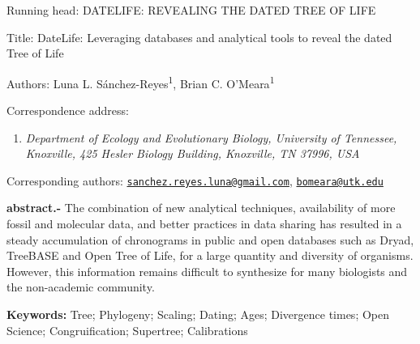 \documentclass[]{article}
\title{}
\author{}
\date{}
\providecommand{\tightlist}{%
  \setlength{\itemsep}{0pt}\setlength{\parskip}{0pt}}
\begin{document}
Running head: DATELIFE: REVEALING THE DATED TREE OF LIFE

Title: DateLife: Leveraging databases and analytical tools to reveal the dated Tree of Life

Authors: Luna L. Sánchez-Reyes\textsuperscript{1}, Brian C. O'Meara\textsuperscript{1}

Correspondence address:

\begin{enumerate}
\def\labelenumi{\arabic{enumi}.}
\tightlist
\item
  \emph{Department of Ecology and Evolutionary Biology, University of Tennessee, Knoxville, 425 Hesler Biology Building, Knoxville, TN 37996, USA}
\end{enumerate}

Corresponding authors: \href{mailto:sanchez.reyes.luna@gmail.com}{\nolinkurl{sanchez.reyes.luna@gmail.com}}, \href{mailto:bomeara@utk.edu}{\nolinkurl{bomeara@utk.edu}}

\newpage

\textbf{abstract.-}
The combination of new analytical techniques, availability of more fossil and molecular
data, and better practices in data sharing has resulted in a steady accumulation
of chronograms in public and open databases such as Dryad, TreeBASE and Open Tree
of Life, for a large quantity and diversity of organisms. However, this information
remains difficult to synthesize for many biologists and the non-academic community.

\textbf{Keywords:} Tree; Phylogeny; Scaling; Dating; Ages; Divergence times; Open Science; Congruification; Supertree; Calibrations

\newpage
\end{document}
